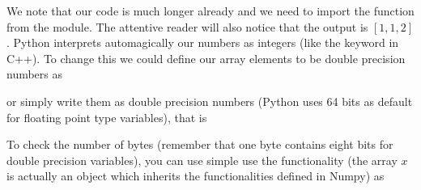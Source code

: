 \documentclass[letterpaper,10pt,english]{sphinxmanual}
\begin{document}
\begin{sphinxVerbatim}[commandchars=\\\{\}]
[1 1 2]
\end{sphinxVerbatim}

We note that our code is much longer already and we need to import the  function from the  module.
The attentive reader will also notice that the output is \([1, 1, 2]\). Python interprets automagically our numbers as integers (like the  keyword in C++). To change this we could define our array elements to be double precision numbers as

\begin{sphinxVerbatim}[commandchars=\\\{\}]
   
  \PYG{p}{[}  \PYG{p}{]}   
\end{sphinxVerbatim}

\begin{sphinxVerbatim}[commandchars=\\\{\}]
[1.38629436 1.94591015 2.07944154]
\end{sphinxVerbatim}

or simply write them as double precision numbers (Python uses 64 bits as default for floating point type variables), that is

\begin{sphinxVerbatim}[commandchars=\\\{\}]
   
  \PYG{p}{[}  \PYG{p}{]}
\end{sphinxVerbatim}

\begin{sphinxVerbatim}[commandchars=\\\{\}]
[1.38629436 1.94591015 2.07944154]
\end{sphinxVerbatim}

To check the number of bytes (remember that one byte contains eight bits for double precision variables), you can use simple use the  functionality (the array \(x\) is actually an object which inherits the functionalities defined in Numpy) as
\end{document}
